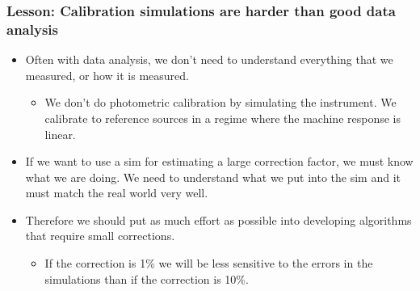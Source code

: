 \documentclass{beamer}
\begin{document}
\frame
{

    \frametitle{Lesson: Calibration simulations are harder than good data analysis}


    \begin{itemize}

        \item Often with data analysis, we don't need to understand everything that
            we measured, or how it is measured.

            \begin{itemize}

                \item We don't do photometric calibration by simulating the
                    instrument.  We calibrate to reference sources in a regime
                    where the machine response is linear.

            \end{itemize}

        \item If we want to use a sim for estimating a large correction factor,
            we must know what we are doing. We need to understand what we put
            into the sim and it must match the real world very well.

        \item Therefore we should put as much effort as possible into developing
            algorithms that require small corrections.

            \begin{itemize}
    
                \item If the correction is 1\% we will be less sensitive to the
                    errors in the simulations than if the correction is 10\%.

            \end{itemize}

    \end{itemize}

}
\end{document}

